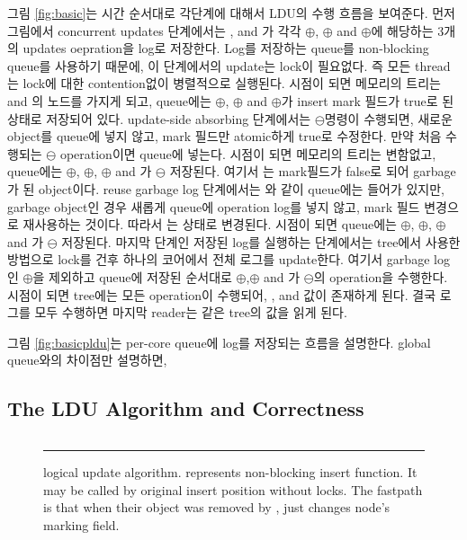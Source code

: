 그림 \ref{fig:basic}는 시간 순서대로 각단계에 대해서 LDU의 수행 흐름을 보여준다.
먼저 그림에서 concurrent updates 단계에서는 ,  and 가 각각
$\oplus$, $\oplus$ and
$\oplus$에 해당하는 3개의 updates oepration을 log로 저장한다. 
Log를 저장하는 queue를 non-blocking queue를 사용하기 때문에, 이 단계에서의 update는 lock이 필요없다. 
즉 모든 thread는 lock에 대한 contention없이 병렬적으로 실행된다. 
 시점이 되면 메모리의 트리는  and 의 노드를 가지게 되고, queue에는 
$\oplus$, $\oplus$ and $\oplus$가 insert mark 필드가
true로 된 상태로 저장되어 있다. 
update-side absorbing 단계에서는  $\ominus$명령이 수행되면, 새로운 object를 queue에 넣지
않고, mark 필드만 atomic하게 true로 수정한다.  
만약 처음 수행되는 $\ominus$ operation이면 queue에 넣는다.
 시점이 되면 메모리의 트리는 변함없고, queue에는 
$\oplus$, $\oplus$, $\oplus$ and 가
$\ominus$ 저장된다. 여기서 는 mark필드가 false로 되어 garbage가 된 object이다.
reuse garbage log 단계에서는 와 같이 queue에는 들어가 있지만, garbage object인 경우 새롭게
queue에 operation log를 넣지 않고, mark 필드 변경으로 재사용하는 것이다. 
따라서 는  상태로 변경된다. 
 시점이 되면 queue에는 
$\oplus$, $\oplus$, $\oplus$ and 가
$\ominus$ 저장된다.
마지막 단계인 저장된 log를 실행하는 단계에서는 tree에서 사용한 방법으로 lock를 건후 하나의 코어에서 
전체 로그를 update한다. 여기서 garbage log인  $\oplus$을 제외하고 queue에 저장된 순서대로 
$\oplus$,$\oplus$ and 가 $\ominus$의 operation을
수행한다.  시점이 되면 tree에는 
모든 operation이 수행되어, ,  and  값이 존재하게 된다.
결국 로그를 모두 수행하면 마지막 reader는 같은 tree의 값을 읽게 된다. 

그림 \ref{fig:basicpldu}는 per-core queue에 log를 저장되는 흐름을 설명한다.
global queue와의 차이점만 설명하면,

\else





\fi

\subsection{The LDU Algorithm and Correctness}
\begin{figure}[tb!]
\inputminted[linenos,fontsize=\footnotesize, tabsize=2]{c}{src/ldu_logical.c}
\rule{\columnwidth}{0.5pt}
\vspace{-\baselineskip}
\caption{ logical update algorithm.  represents
 non-blocking insert function.
It may be called by original insert position without locks. The fastpath is
 that when their object was removed by ,
  just changes node's marking field.}
\label{fig:gldulogicalupdate}
\end{figure}

